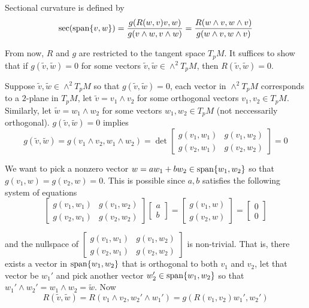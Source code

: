 Sectional curvature is defined by
$$
	\sec(\operatorname{span} \{v, w\}) = \frac{g(R(w, v) v, w)}{g(v \wedge w, v \wedge w)} = \frac{R(w \wedge v, w \wedge v)}{g(w \wedge v, w \wedge v)}
$$

From now, $R$ and $g$ are restricted to the tangent space $T_p M$. It suffices to show that if $g(\tilde{v}, \tilde{w}) = 0$ for some vectors $\tilde{v}, \tilde{w} \in \wedge^2 T_pM$, then $R(\tilde{v}, \tilde{w}) = 0$.

Suppose $\tilde{v}, \tilde{w} \in \wedge^2 T_pM$ so that $g(\tilde{v}, \tilde{w}) = 0$, each vector in $\wedge^2 T_p M$ corresponds to a $2$-plane in $T_p M$, let $\tilde{v} = v_1 \wedge v_2$ for some orthogonal vectors $v_1, v_2 \in T_p M$. Similarly, let $\tilde{w} = w_1 \wedge w_2$ for some vectors $w_1, w_2 \in T_p M$ (not neccessarily orthogonal). $g(\tilde{v}, \tilde{w}) = 0$ implies
$$
	g(\tilde{v}, \tilde{w}) = g(v_1 \wedge v_2, w_1 \wedge w_2) = \det \begin{bmatrix}
		g(v_1, w_1) & g(v_1, w_2) \\
		g(v_2, w_1) & g(v_2, w_2)
	\end{bmatrix} = 0
$$

We want to pick a nonzero vector $w = a w_1 + b w_2 \in \operatorname{span} \{w_1, w_2\}$ so that $g(v_1, w) = g(v_2, w) = 0$. This is possible since $a, b$ satisfies the following system of equations
$$
	\begin{bmatrix}
		g(v_1, w_1) & g(v_1, w_2) \\
		g(v_2, w_1) & g(v_2, w_2)
	\end{bmatrix} \begin{bmatrix}
		a \\ b
	\end{bmatrix} = \begin{bmatrix}
		g(v_1, w) \\ g(v_2, w)
	\end{bmatrix} = \begin{bmatrix}
		0 \\ 0
	\end{bmatrix}
$$

and the nullspace of $\begin{bmatrix}
	g(v_1, w_1) & g(v_1, w_2) \\
	g(v_2, w_1) & g(v_2, w_2)
\end{bmatrix}$ is non-trivial. That is, there exists a vector in $\operatorname{span} \{w_1, w_2\}$ that is orthogonal to both $v_1$ and $v_2$, let that vector be $w_1'$ and pick another vector $w_2' \in \operatorname{span} \{w_1, w_2\}$ so that $w_1' \wedge w_2' = w_1 \wedge w_2 = \tilde{w}$. Now
$$
	R(\tilde{v}, \tilde{w}) = R(v_1 \wedge v_2, w_2' \wedge w_1') = g(R(v_1, v_2) w_1', w_2')
$$

